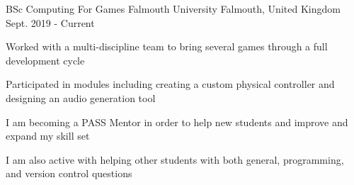 

\begin{cventries}

  \cventry
    {BSc Computing For Games} %
    {Falmouth University} %
    {Falmouth, United Kingdom} %
    {Sept. 2019 - Current} %
    {
      \begin{cvitems} %
        \item Worked with a multi-discipline team to bring several games through a full development cycle
        \item Participated in modules including creating a custom physical controller and designing an audio generation tool
        \item I am becoming a PASS Mentor in order to help new students and improve and expand my skill set
        \item I am also active with helping other students with both general, programming, and version control questions
      \end{cvitems}
    }

\end{cventries}
